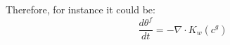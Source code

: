 Therefore, for instance it could be:
\begin{equation}
\frac{d \theta^f}{dt} = - {\nabla}\cdot  K_w (c^g)
\end{equation}